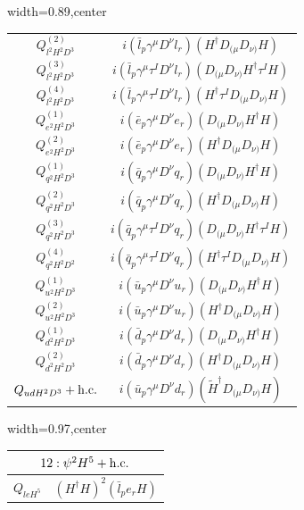 \begin{table}[H]
\begin{center}
\begin{adjustbox}{width=0.89\textwidth,center}
\begin{minipage}[t]{6.9cm}
\begin{tabular}[t]{c|c}
%
$Q_{l^2H^2D^3}^{(2)}$  &  $i (\bar{l}_p \gamma^{\mu} D^{\nu} l_r) (H^{\dag} D_{(\mu}D_{\nu)} H)$ \\
%
$Q_{l^2H^2D^3}^{(3)}$  &  $i (\bar{l}_p \gamma^{\mu} \tau^I D^{\nu} l_r) (D_{(\mu}D_{\nu)}H^{\dag} \tau^I H)$ \\
%
$Q_{l^2H^2D^3}^{(4)}$  &  $i (\bar{l}_p \gamma^{\mu} \tau^I D^{\nu} l_r) (H^{\dag} \tau^I D_{(\mu}D_{\nu)} H)$ \\
%
$Q_{e^2H^2D^3}^{(1)}$  &  $i (\bar{e}_p \gamma^{\mu} D^{\nu} e_r) (D_{(\mu}D_{\nu)}H^{\dag} H)$ \\
%
$Q_{e^2H^2D^3}^{(2)}$  &  $i (\bar{e}_p \gamma^{\mu} D^{\nu} e_r) (H^{\dag} D_{(\mu}D_{\nu)} H)$ \\
%
$Q_{q^2H^2D^3}^{(1)}$  &  $i (\bar{q}_p \gamma^{\mu} D^{\nu} q_r) (D_{(\mu}D_{\nu)}H^{\dag} H)$ \\
%
$Q_{q^2H^2D^3}^{(2)}$  &  $i (\bar{q}_p \gamma^{\mu} D^{\nu} q_r) (H^{\dag} D_{(\mu}D_{\nu)} H)$ \\
%
$Q_{q^2H^2D^3}^{(3)}$  &  $i (\bar{q}_p \gamma^{\mu} \tau^I D^{\nu} q_r) (D_{(\mu}D_{\nu)}H^{\dag} \tau^I H)$ \\
%
$Q_{q^2H^2D^2}^{(4)}$  &  $i (\bar{q}_p \gamma^{\mu} \tau^I D^{\nu} q_r) (H^{\dag} \tau^I D_{(\mu}D_{\nu)} H)$ \\
%
$Q_{u^2H^2D^3}^{(1)}$  &  $i (\bar{u}_p \gamma^{\mu} D^{\nu} u_r) (D_{(\mu}D_{\nu)}H^{\dag} H)$ \\
%
$Q_{u^2H^2D^3}^{(2)}$  &  $i (\bar{u}_p \gamma^{\mu} D^{\nu} u_r) (H^{\dag} D_{(\mu}D_{\nu)} H)$ \\
%
$Q_{d^2H^2D^3}^{(1)}$  &  $i (\bar{d}_p \gamma^{\mu} D^{\nu} d_r) (D_{(\mu}D_{\nu)}H^{\dag} H)$ \\
%
$Q_{d^2H^2D^3}^{(2)}$  &  $i (\bar{d}_p \gamma^{\mu} D^{\nu} d_r) (H^{\dag} D_{(\mu}D_{\nu)} H)$ \\
%
$Q_{udH^2D^3} + \mathrm{h.c.}$  &  $i (\bar{u}_p \gamma^{\mu} D^{\nu} d_r) (\widetilde H^{\dag} D_{(\mu}D_{\nu)} H)$
\end{tabular}
\end{minipage}
\end{adjustbox}
\begin{adjustbox}{width=0.97\textwidth,center}
\small
\begin{minipage}[t]{3.7cm}
\renewcommand{\arraystretch}{1.5}
\begin{tabular}[t]{c|c}
\multicolumn{2}{c}{\boldmath$12:\psi^2H^5 + \mathrm{h.c.}$} \\
\hline
$Q_{leH^5}$  & $(H^\dag H)^2 (\bar l_p e_r H)$ \\

\end{tabular}
\end{minipage}
\end{adjustbox}
\end{center}
\end{table}
